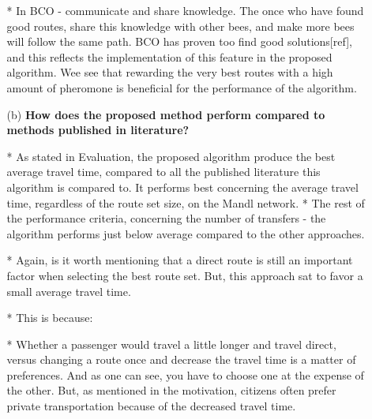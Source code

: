 \begin{enumerate}[label=\textbf{\arabic*})]
\begin{enumerate}
    * In BCO - communicate and share knowledge. The once who have found good routes, share this knowledge with other bees, and make more bees will follow the same path. BCO has proven too find good solutions[ref], and this reflects the implementation of this feature in the proposed algorithm. Wee see that rewarding the very best routes with a high amount of pheromone is beneficial for the performance of the algorithm. 

    \item[(b)]  \textbf{How does the proposed method perform compared to methods published in literature?}

    * As stated in Evaluation, the proposed algorithm produce the best average travel time, compared to all the published literature this algorithm is compared to. It performs best concerning the average travel time, regardless of the route set size, on the Mandl network. 
    * The rest of the performance criteria, concerning the number of transfers - the algorithm performs just below average compared to the other approaches. 

    * Again, is it worth mentioning that a direct route is still an important factor when selecting the best route set. But, this approach sat to favor a small average travel time.

    * This is because:

    * Whether a passenger would travel a little longer and travel direct, versus changing a route once and decrease the travel time is a matter of preferences. And as one can see, you have to choose one at the expense of the other. But, as mentioned in the motivation, citizens often prefer private transportation because of the decreased travel time. 

    \end{enumerate}
\end{enumerate}